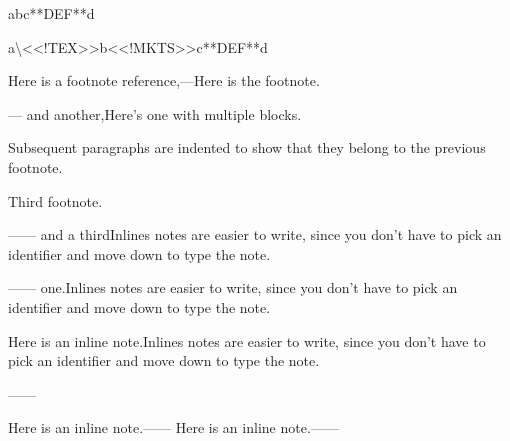 \footnotemark[1]\footnotemark[2]\footnotemark[3]\footnotemark[4]\footnotemark[5]\footnotemark[6]\footnotetext[1]{}\footnotetext[2]{}\footnotetext[3]{}\footnotetext[4]{}\footnotetext[5]{}\footnotetext[6]{}
\mktsShowpar\par
abc**DEF**d\mktsShowpar\par
{\mktsStyleCode{}a\textbackslash{}<<!TEX>>b<<!MKTS>>c**DEF**d}\mktsShowpar\par
Here is a footnote reference,---Here is the footnote.\mktsShowpar\par
--- and another,Here’s one with multiple blocks.\mktsShowpar\par
Subsequent paragraphs are indented to show that they
belong to the previous footnote.\mktsShowpar\par
Third footnote.\mktsShowpar\par
------
and a thirdInlines notes are easier to write, since
you don't have to pick an identifier and move down to type the
note.\mktsShowpar\par
------ one.Inlines notes are easier to write, since
you don't have to pick an identifier and move down to type the
note.\mktsShowpar\par
\mktsShowpar\par
Here is an inline note.Inlines notes are easier to write, since
you don't have to pick an identifier and move down to type the
note.\mktsShowpar\par
------\mktsShowpar\par
Here is an inline note.------ Here is an inline note.------

